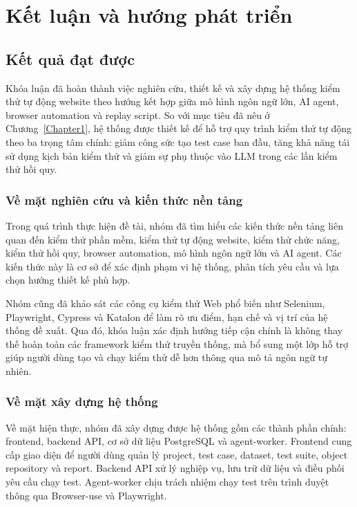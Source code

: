 
\chapter{Kết luận và hướng phát triển}
\label{Chapter8}

\section{Kết quả đạt được}

Khóa luận đã hoàn thành việc nghiên cứu, thiết kế và xây dựng hệ thống kiểm thử tự động website theo hướng kết hợp giữa mô hình ngôn ngữ lớn, AI agent, browser automation và replay script. So với mục tiêu đã nêu ở Chương~\ref{Chapter1}, hệ thống được thiết kế để hỗ trợ quy trình kiểm thử tự động theo ba trọng tâm chính: giảm công sức tạo test case ban đầu, tăng khả năng tái sử dụng kịch bản kiểm thử và giảm sự phụ thuộc vào LLM trong các lần kiểm thử hồi quy.

\subsection{Về mặt nghiên cứu và kiến thức nền tảng}

Trong quá trình thực hiện đề tài, nhóm đã tìm hiểu các kiến thức nền tảng liên quan đến kiểm thử phần mềm, kiểm thử tự động website, kiểm thử chức năng, kiểm thử hồi quy, browser automation, mô hình ngôn ngữ lớn và AI agent. Các kiến thức này là cơ sở để xác định phạm vi hệ thống, phân tích yêu cầu và lựa chọn hướng thiết kế phù hợp.

Nhóm cũng đã khảo sát các công cụ kiểm thử Web phổ biến như Selenium, Playwright, Cypress và Katalon để làm rõ ưu điểm, hạn chế và vị trí của hệ thống đề xuất. Qua đó, khóa luận xác định hướng tiếp cận chính là không thay thế hoàn toàn các framework kiểm thử truyền thống, mà bổ sung một lớp hỗ trợ giúp người dùng tạo và chạy kiểm thử dễ hơn thông qua mô tả ngôn ngữ tự nhiên.

\subsection{Về mặt xây dựng hệ thống}

Về mặt hiện thực, nhóm đã xây dựng được hệ thống gồm các thành phần chính: frontend, backend API, cơ sở dữ liệu PostgreSQL và agent-worker. Frontend cung cấp giao diện để người dùng quản lý project, test case, dataset, test suite, object repository và report. Backend API xử lý nghiệp vụ, lưu trữ dữ liệu và điều phối yêu cầu chạy test. Agent-worker chịu trách nhiệm chạy test trên trình duyệt thông qua Browser-use và Playwright.

